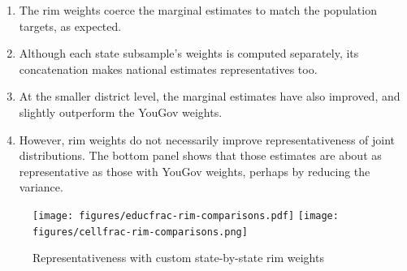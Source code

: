 \documentclass[11pt]{article}
\begin{document}
\medskip
\begin{enumerate}
\item The rim weights coerce the marginal estimates to match the population targets, as expected.
\item Although each state subsample's weights is computed separately, its concatenation makes national estimates representatives too. 
\item At the smaller district level, the marginal estimates have also improved, and slightly outperform the YouGov weights.
\item However, rim weights do not necessarily improve representativeness of joint distributions. The bottom panel shows that those estimates are about as representative as those with YouGov weights, perhaps by reducing the variance.
\end{enumerate}

\FloatBarrier

\begin{figure}[!ht]
\centering
\caption{Representativeness with custom state-by-state rim weights \label{fig:rim-comparisons}}
\texttt{[image: figures/educfrac-rim-comparisons.pdf]}
\texttt{[image: figures/cellfrac-rim-comparisons.png]}
\end{figure}
\end{document}

